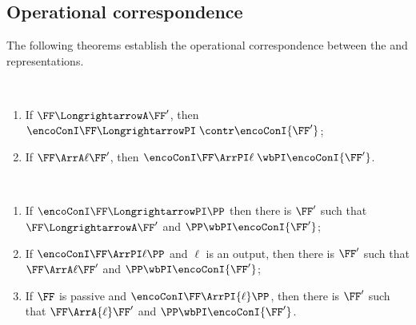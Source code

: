 \subsection{Operational correspondence}
\label{s:OC}

The following theorems establish the operational correspondence between the \AOGS and \piI representations. 

\begin{theorem} %
\label{t:opcorrCON_w}
$ $ \begin{enumerate}

\item If $\FF \LongrightarrowA \FF'$, then 
$\encoConI \FF \LongrightarrowPI  \; \contr \encoConI {\FF'}$;


\item If $\FF \ArrA\ell \FF'$, then
$ \encoConI \FF \ArrPI\ell  
\; \wbPI
\encoConI {\FF'}$.
\end{enumerate} 
\end{theorem} 



\begin{theorem} %
\label{t:opcorrCON2_w}
$ $ \begin{enumerate}


\item If 
$ \encoConI \FF \LongrightarrowPI \PP$ then there is $\FF'$ such that 
$\FF \LongrightarrowA \FF'$  and  
$\PP  \wbPI \encoConI {\FF'}$; 


\item If
$ \encoConI \FF \ArrPI\ell \PP$
and  $\ell$ is an output, 
 then there is $\FF'$ such that
 $\FF \ArrA\ell \FF'$
and $\PP \wbPI  \encoConI {\FF'}$;


\item If  $\FF$ is passive and 
$ \encoConI \FF \ArrPI{\ell} \PP$, 
then 
 there is $\FF'$ such that 
$\FF \ArrA{\ell} \FF'$
and $\PP  \wbPI \encoConI {\FF'}$.
\end{enumerate} 
\end{theorem} 

